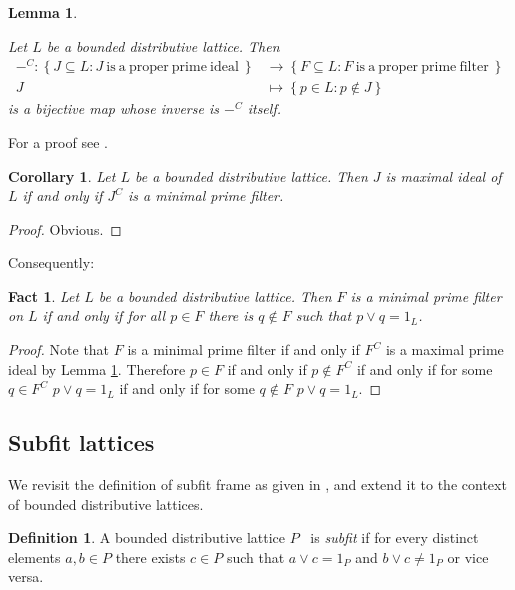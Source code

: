 \documentclass{article}
\theoremstyle{plain}
\newtheorem{lemma}[theorem]{Lemma}
\newtheorem{corollary}[theorem]{Corollary}
\newtheorem{fact}[theorem]{Fact}
\theoremstyle{definition}
\newtheorem{definition}[theorem]{Definition}
\theoremstyle{remark}
\newcommand{\bp}[1]{\left\lbrace #1 \right\rbrace}
\newcommand{\0}{\mathbbm 0}
\newcommand{\1}{\mathbbm 1}
\newcommand{\2}{\mathbbm 2}
\begin{document}
\begin{lemma} %
\label{lemma:idealsandfilters}

Let $L$ be a  bounded distributive lattice. Then 
\begin{align*}
        -^C: \bp{J \subseteq L : J \mathrm{ \ is\ a\ proper\ prime\ ideal\ }} &\to \bp{F \subseteq L : F \mathrm{ \ is \ a\ proper\ prime\ filter\ }}\\
        J &\mapsto \bp{p \in L: p \notin J}
\end{align*}
is a bijective map whose inverse is $-^C$ itself.  
\end{lemma}
For a proof see \cite[Lemma 3.9]{gehrke2024topological}.


\begin{corollary}
\label{cor:idealsandfilters}
    Let $L$ be a  bounded distributive lattice. Then  $J$ is maximal ideal of $L$ if and only if $J^C$ is a minimal prime filter.
\end{corollary}
\begin{proof}
    Obvious.
\end{proof}


Consequently:
\begin{fact}\label{fact:idealsandfilters-1}
Let $L$ be a  bounded distributive lattice. Then $F$ is a minimal prime filter on $L$ if and only if for all $p\in F$ there is $q\not\in F$ such that $p\vee q=1_L$.
\end{fact}
\begin{proof}
Note that $F$ is a minimal prime filter if and only if $F^C$ is a maximal prime ideal by Lemma \ref{lemma:idealsandfilters}. Therefore $p\in F$ if and only if $p\not\in F^C$ if and only if for some $q\in F^C$ $p\vee q=1_L$ if and only if for some $q\not\in F$ $p\vee q=1_L$.
\end{proof}



\subsection{Subfit lattices}
\label{subsec:subfitlattices}
We revisit the definition of subfit frame as given in \cite{picado2011frames}, and extend it to the context of bounded distributive lattices.

\begin{definition} 
\label{def:subfit}
A bounded distributive lattice $P$ \ is \emph{subfit} if for every distinct elements $a,b \in P$ there exists $c \in P$ such that $a \vee c= 1_P$ and $b \vee c \neq 1_P $ or vice versa.
\end{definition}
\end{document}
